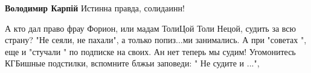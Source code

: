 \begin{itemize}
\begin{itemize}
 
\textbf{Володимир Карпій} Истинна правда, солидаинн!

\end{itemize}


А кто дал право фрау Форион, или мадам ТолиЦой Толи Нецой, судить за всю
страну? "Не сеяли, не пахали", а только попиз...ми занимались. А при "советах
", еще и "стучали " по подписке на своих. Ан нет теперь мы судим! Угомонитесь
КГБишные подстилки, вспомните блжьи заповеди: " Не судите и ...",
\end{itemize}

